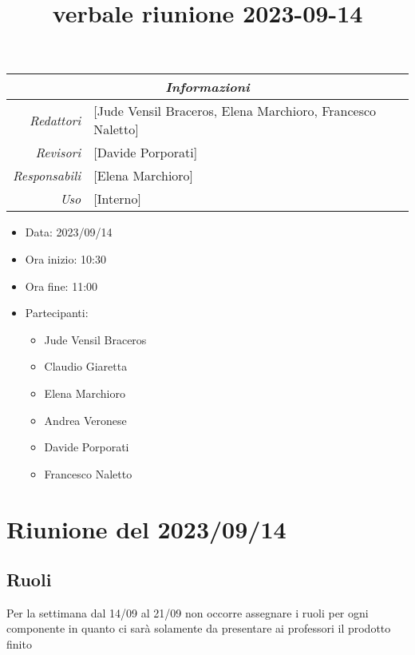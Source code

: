 \documentclass[12pt]{article}
\begin{document}
\graphicspath{ {../../templates/img} }

\title{verbale riunione 2023-09-14}

\firstPage
\maketitle

\begin{center}
\begin{tabular}{r | l}
    \multicolumn{2}{c}{\textit{Informazioni}}\\
    \hline
    
        \textit{Redattori} &
        [Jude Vensil Braceros, Elena Marchioro, Francesco Naletto]\makecell{}\\
    
        \textit{Revisori} &
        [Davide Porporati]\makecell{}\\
        \textit{Responsabili} &
        [Elena Marchioro]\makecell{}\\
            \textit{Uso} & 
            [Interno]\makecell{}\\
\end{tabular}
    \begin{itemize}
    \item[] Data: 2023/09/14
    \item[] Ora inizio: 10:30
    \item[] Ora fine: 11:00
    \item[] Partecipanti:
    \begin{itemize}
    \item[] Jude Vensil Braceros
    \item[] Claudio Giaretta
    \item[] Elena Marchioro
    \item[] Andrea Veronese
    \item[] Davide Porporati
    \item[] Francesco Naletto
    \end{itemize}
\end{itemize}
\end{center}


\tableofcontents
\printindex 
\section{Riunione del 2023/09/14}
\subsection{Ruoli}
Per la settimana dal 14/09 al 21/09 non occorre assegnare i ruoli per ogni componente in quanto ci sarà solamente da presentare ai professori il prodotto finito
\end{document}
